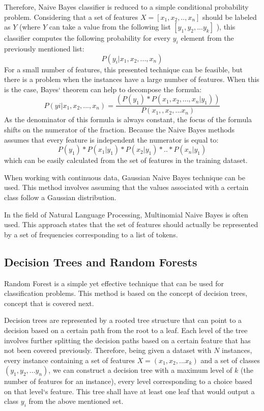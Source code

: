 \documentclass[12pt,a4paper]{report}
\begin{document}
Therefore, Naive Bayes classifier is reduced to a simple conditional probability problem. Considering that a set of features $ X = [x_1, x_2, .., x_n] $ should be labeled as $Y$ (where $Y$ can take a value from the following list $ [y_1, y_2, ...y_k] $ ), this classifier computes the following probability for every $y_i$ element from the previously mentioned list:
\begin{equation}
    P(y_i | x_1, x_2, ..., x_n) 
\end{equation}
For a small number of features, this presented technique can be feasible, but there is a problem when the instances have a large number of features. When this is the case, Bayes` theorem can help to decompose the formula:
\begin{equation}
    P(yi| x_1, x_2, ..., x_n) = \frac{ (P(y_1) * P(x_1, x_2, ..., x_n | y_1)) }{P(x_1, ,x_2, ... x_n)}
\end{equation}
As the denominator of this formula is always constant, the focus of the formula shifts on the numerator of the fraction. Because the Naive Bayes methods assumes that every feature is independent the numerator is equal to:
\begin{equation}
    P(y_1) * P(x_1|y_1) * P(x_2|y_1) * .. * P(x_n|y_1)
\end{equation}
which can be easily calculated from the set of features in the training dataset.

When working with continuous data, Gaussian Naive Bayes technique can be used. This method involves assuming that the values associated with a certain class follow a Gaussian distribution.

In the field of Natural Language Processing, Multinomial Naive Bayes is often used. This approach states that the set of features should actually be represented by a set of frequencies corresponding to a list of tokens. 


\subsection{Decision Trees and Random Forests}

Random Forest is a simple yet effective technique that can be used for classification problems. This method is based on the concept of decision trees, concept that is covered next.

Decision trees are represented by a rooted tree structure that can point to a decision based on a certain path from the root to a leaf. Each level of the tree involves further splitting the decision paths based on a certain feature that has not been covered previously. Therefore, being given a dataset with $N$ instances, every instance containing a set of features $X=(x_1,x_2, ... x_k)$ and a set of classes $(y_1, y_2, ... y_n)$, we can construct a decision tree with a maximum level of $k$ (the number of features for an instance), every level corresponding to a choice based on that level`s feature. This tree shall have at least one leaf that would output a class $y_i$ from the above mentioned set.
\end{document}
